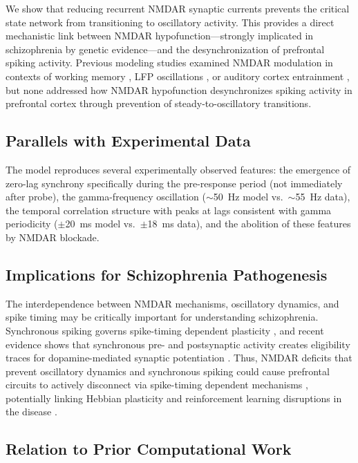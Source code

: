 \documentclass[10pt]{article}
\begin{document}
We show that reducing recurrent NMDAR synaptic currents prevents the critical state network from transitioning to oscillatory activity. This provides a direct mechanistic link between NMDAR hypofunction---strongly implicated in schizophrenia by genetic evidence---and the desynchronization of prefrontal spiking activity. Previous modeling studies examined NMDAR modulation in contexts of working memory \citep{wang1999synaptic, compte2000synaptic}, LFP oscillations \citep{brunel2003fast}, or auditory cortex entrainment \citep{kirli2014computational}, but none addressed how NMDAR hypofunction desynchronizes spiking activity in prefrontal cortex through prevention of steady-to-oscillatory transitions.

\subsection{Parallels with Experimental Data}

The model reproduces several experimentally observed features: the emergence of zero-lag synchrony specifically during the pre-response period (not immediately after probe), the gamma-frequency oscillation ($\sim$50~Hz model vs.\ $\sim$55~Hz data), the temporal correlation structure with peaks at lags consistent with gamma periodicity ($\pm$20~ms model vs.\ $\pm$18~ms data), and the abolition of these features by NMDAR blockade.

\subsection{Implications for Schizophrenia Pathogenesis}

The interdependence between NMDAR mechanisms, oscillatory dynamics, and spike timing may be critically important for understanding schizophrenia. Synchronous spiking governs spike-timing dependent plasticity \citep{dan2004spike}, and recent evidence shows that synchronous pre- and postsynaptic activity creates eligibility traces for dopamine-mediated synaptic potentiation \citep{he2015eligibility, yagishita2014critical}. Thus, NMDAR deficits that prevent oscillatory dynamics and synchronous spiking could cause prefrontal circuits to actively disconnect via spike-timing dependent mechanisms \citep{zick2021disparate}, potentially linking Hebbian plasticity and reinforcement learning disruptions in the disease \citep{kasai2021spine}.

\subsection{Relation to Prior Computational Work}
\end{document}
